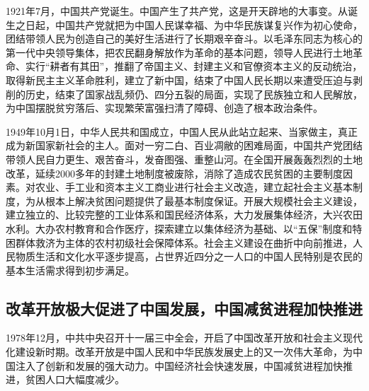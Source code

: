 \documentclass{ctexart}
\begin{document}
1921年7月，中国共产党诞生。中国产生了共产党，这是开天辟地的大事变。从诞生之日起，中国共产党就把为中国人民谋幸福、为中华民族谋复兴作为初心使命，团结带领人民为创造自己的美好生活进行了长期艰辛奋斗。以毛泽东同志为核心的第一代中央领导集体，把农民翻身解放作为革命的基本问题，领导人民进行土地革命、实行“耕者有其田”，推翻了帝国主义、封建主义和官僚资本主义的反动统治，取得新民主主义革命胜利，建立了新中国，结束了中国人民长期以来遭受压迫与剥削的历史，结束了国家战乱频仍、四分五裂的局面，实现了民族独立和人民解放，为中国摆脱贫穷落后、实现繁荣富强扫清了障碍、创造了根本政治条件。

1949年10月1日，中华人民共和国成立，中国人民从此站立起来、当家做主，真正成为新国家新社会的主人。面对一穷二白、百业凋敝的困难局面，中国共产党团结带领人民自力更生、艰苦奋斗，发奋图强、重整山河。在全国开展轰轰烈烈的土地改革，延续2000多年的封建土地制度被废除，消除了造成农民贫困的主要制度因素。对农业、手工业和资本主义工商业进行社会主义改造，建立起社会主义基本制度，为从根本上解决贫困问题提供了最基本制度保证。开展大规模社会主义建设，建立独立的、比较完整的工业体系和国民经济体系，大力发展集体经济，大兴农田水利。大办农村教育和合作医疗，探索建立以集体经济为基础、以“五保”制度和特困群体救济为主体的农村初级社会保障体系。社会主义建设在曲折中向前推进，人民物质生活和文化水平逐步提高，占世界近四分之一人口的中国人民特别是农民的基本生活需求得到初步满足。

\subsection{改革开放极大促进了中国发展，中国减贫进程加快推进}

1978年12月，中共中央召开十一届三中全会，开启了中国改革开放和社会主义现代化建设新时期。改革开放是中国人民和中华民族发展史上的又一次伟大革命，为中国注入了创新和发展的强大动力。中国经济社会快速发展，中国减贫进程加快推进，贫困人口大幅度减少。
\end{document}
